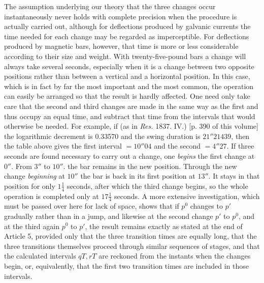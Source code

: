 The assumption underlying our theory that the three changes occur instantaneously never holds with complete precision when the procedure is actually carried out, although for deflections produced by galvanic currents the time needed for each change may be regarded as imperceptible. For deflections produced by magnetic bars, however, that time is more or less considerable according to their size and weight. With twenty-five-pound bars a change will always take several seconds, especially when it is a change between two opposite positions rather than between a vertical and a horizontal position. In this case, which is in fact by far the most important and the most common, the operation can easily be arranged so that the result is hardly affected. One need only take care that the second and third changes are made in the same way as the first and thus occupy an equal time, and subtract that time from the intervals that would otherwise be needed. For example, if (as in \textit{Res.} 1837. IV.) [p. 390 of this volume] the logarithmic decrement is 0.33570 and the swing duration is $21''21439$, then the table above gives the first interval $=10''04$ and the second $=4''27$. If three seconds are found necessary to carry out a change, one \textit{begins} the first change at $0''$. From $3''$ to $10''$. the bar remains in the new position. Through the new change \textit{beginning} at $10''$ the bar is back in its first position at $13''$. It stays in that position for only $1\tfrac{1}{4}$ seconds, after which the third change begins, so the whole operation is completed only at $17\tfrac{1}{4}$ seconds. A more extensive investigation, which must be passed over here for lack of space, shows that if $p^0$ changes to $p'$ gradually rather than in a jump, and likewise at the second change $p'$ to $p^0$, and at the third again $p^0$ to $p'$, the result remains exactly as stated at the end of Article 5, provided only that the three transition times are equally long, that the three transitions themselves proceed through similar sequences of stages, and that the calculated intervals $qT,rT$ are reckoned from the instants when the changes begin, or, equivalently, that the first two transition times are included in those intervals.

